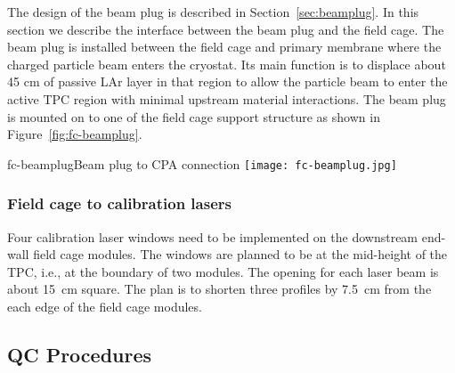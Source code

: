 
The design of the beam plug is described in Section~\ref{sec:beamplug}. In this section we describe the interface between the beam plug and the field cage. The beam plug is installed between the field cage and primary membrane where the charged particle beam enters the cryostat. Its main function is to displace about 45 cm of passive LAr layer in that region to allow the particle beam to enter the active TPC region with minimal upstream material interactions. The beam plug is mounted on to one of the field cage support structure as shown in Figure~\ref{fig:fc-beamplug}.
\begin{cdrfigure}{fc-beamplug}{Beam plug to CPA connection}
\texttt{[image: fc-beamplug.jpg]}
\end{cdrfigure}


\subsubsection{Field cage to calibration lasers}

Four calibration laser windows need to be implemented on the downstream end-wall field cage modules.  The windows are planned to be at the mid-height of the TPC, i.e., at the boundary of two %
modules.  The opening for each laser beam is about 15~cm square.  The plan is to shorten three profiles by 7.5~cm from the each edge of the field cage modules.



\subsection{QC Procedures}

 


